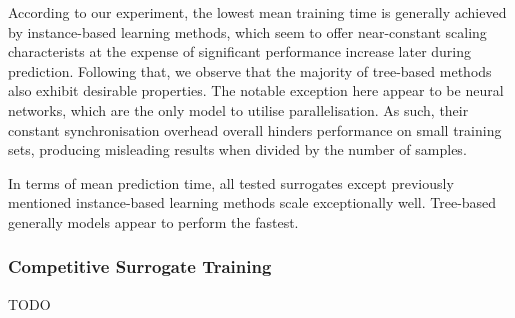 According to our experiment, the lowest mean training time is generally achieved
by instance-based learning methods, which seem to offer near-constant scaling
characterists at the expense of significant performance increase later during
prediction. Following that, we observe that the majority of tree-based methods also exhibit
desirable properties. The notable exception here appear to be neural networks,
which are the only model to utilise parallelisation. As such, their constant
synchronisation overhead overall hinders performance on small training sets,
producing misleading results when divided by the number of samples.

In terms of mean prediction time, all tested surrogates except previously mentioned
instance-based learning methods scale exceptionally well. Tree-based generally
models appear to perform the fastest.


\subsubsection{Competitive Surrogate Training}

TODO

